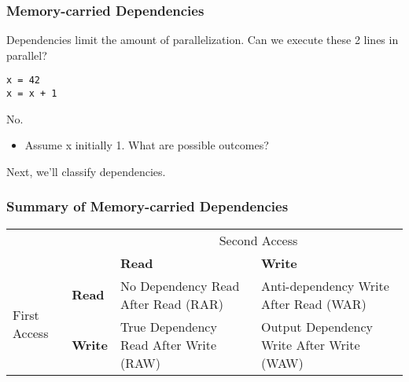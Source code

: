 \begin{frame}[fragile]
\frametitle{Memory-carried Dependencies}

Dependencies limit the amount of parallelization.
\vfill
Can we execute these 2 lines in parallel?
\begin{lstlisting}
x = 42
x = x + 1  
\end{lstlisting}
\pause
\alert{No.}\\[1em]
\begin{itemize}
\item Assume x initially 1. What are possible outcomes?
\pause \newline {}\\[1em]

\end{itemize}

Next, we'll classify dependencies.



\end{frame}


\begin{frame}
\frametitle{Summary of Memory-carried Dependencies}
\begin{center}
\begin{tabular}{ll|p{2.8cm}p{3.2cm}}
& & \multicolumn{2}{c}{Second Access} \\ 
&  & \bf Read & \bf Write \\ \hline
\multirow{2}{*}{First Access} & \bf Read & No Dependency Read After Read (RAR)  & Anti-dependency Write After Read (WAR) \\[0.5em]
& \bf Write & True Dependency Read After Write (RAW) & Output Dependency Write After Write (WAW) \\
\end{tabular}
\end{center}
\end{frame}



